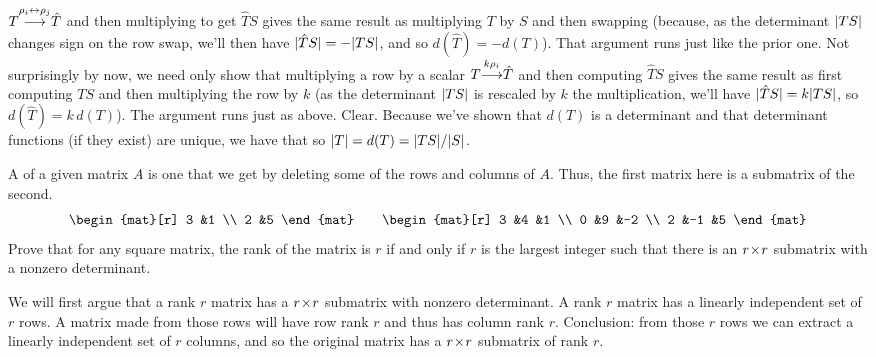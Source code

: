 \begin{exercises}
\begin{answer}
\begin{exparts}
          $
            T\smash[b]{\mathrel{ \mathop{\longrightarrow}\limits^{\rho_i\leftrightarrow\rho_j\mathstrut}_{ \begin{subarray}{l} \relax \end{subarray}}}}\hat{T}
          $
          and then multiplying to get \( \hat{T}S \) gives the same result as
          multiplying \( T \) by \( S \) and then swapping (because,
          as the determinant \( \deter{TS} \) changes sign on
          the row swap, we'll then have \( \deter{\hat{T}S}=-\deter{TS} \),
          and so \( d(\hat{T})=-d(T) \)).
          That argument runs just like the prior one.
        \partsitem Not surprisingly by now, we need only show that 
          multiplying a row by a scalar
          $
            T\smash[b]{\mathrel{ \mathop{\longrightarrow}\limits^{k\rho_i\mathstrut}_{ \begin{subarray}{l} \relax \end{subarray}}}}\hat{T}
          $
          and then computing \( \hat{T}S \) gives the same result as
          first computing \( TS \) and then multiplying the row by \( k \)
          (as the determinant \( \deter{TS} \) is rescaled by \( k \)
          the multiplication, we'll have \( \deter{\hat{T}S}=k\deter{TS} \),
          so \( d(\hat{T})=k\,d(T) \)).
          The argument runs just as above.
        \partsitem Clear.
        \partsitem Because we've shown that \( d(T) \) is a determinant
          and that determinant functions (if they exist) are
          unique, we have that
          so \( \deter{T}=d(T)=\deter{TS}/\deter{S} \).
      \end{exparts}  
    \end{answer}
  \item 
    A  
    of a given matrix $A$ is one that we get by deleting 
    some of the rows and columns of $A$.
    Thus, the first matrix here is a submatrix of the second.
    \begin{equation*}
      \begin{mat}[r]
        3  &1  \\
        2  &5
      \end{mat}
      \qquad
      \begin{mat}[r]
        3  &4  &1  \\
        0  &9  &-2 \\
        2  &-1 &5
      \end{mat}
    \end{equation*}
    Prove that for any square matrix,
    the rank of the matrix is $r$ if and only if
    \( r \) is the largest
    integer such that there is an \( r \! \times \! r \) submatrix with a nonzero
    determinant.
    \begin{answer}
      We will first argue that a rank \( r \) matrix has a \( r \! \times \! r \)
      submatrix with nonzero determinant.
      A rank \( r \) matrix has a linearly independent set of \( r \) rows.
      A matrix made from those rows will have row rank \( r \) and thus has
      column rank \( r \).
      Conclusion: from those \( r \) rows we can extract a linearly
      independent set of \( r \) columns, and so the original matrix has a
      \( r \! \times \! r \) submatrix of rank \( r \).


\end{answer}
\end{exercises}
